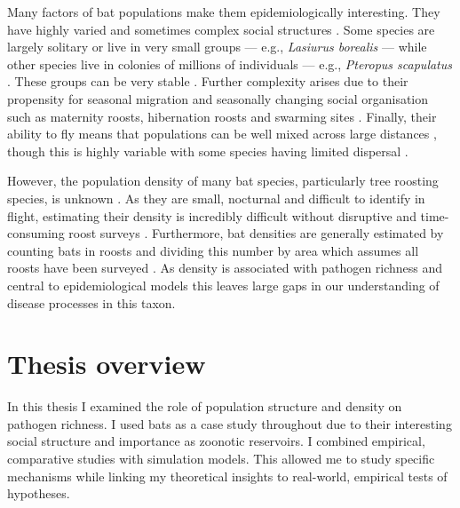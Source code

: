 Many factors of bat populations make them epidemiologically interesting.
They have highly varied and sometimes complex social structures \cite{kerth2008causes}.
Some species are largely solitary or live in very small groups --- e.g., \emph{Lasiurus borealis} \cite{shump1982lasiurus} --- while other species live in colonies of millions of individuals --- e.g., \emph{Pteropus scapulatus} \cite{birt2008little}.
These groups can be very stable \cite{kerth2011bats, mccracken1981social}.
Further complexity arises due to their propensity for seasonal migration \cite{fleming2003ecology, richter2008first, cryan2014continental} and seasonally changing social organisation such as maternity roosts, hibernation roosts and swarming sites \cite{kerth2008causes}.
Finally, their ability to fly means that populations can be well mixed across large distances \cite{peel2013continent, petit1999male}, though this is highly variable with some species having limited dispersal \cite{wilmer1994extreme}.

However, the population density of many bat species, particularly tree roosting species, is unknown \cite{clement2013estimating}.
As they are small, nocturnal and difficult to identify in flight, estimating their density is incredibly difficult without disruptive and time-consuming roost surveys \cite{kloepper2016estimating, humphrey1971photographic, sabol1995technique}.
Furthermore, bat densities are generally estimated by counting bats in roosts and dividing this number by area which assumes all roosts have been surveyed \cite{speakman1991minimum, zahn2006population, moreno2004colony}. 
As density is associated with pathogen richness \cite{kamiya2014determines} and central to epidemiological models \cite{may1979population, anderson1979population} this leaves large gaps in our understanding of disease processes in this taxon.





\section{Thesis overview}

In this thesis I examined the role of population structure and density on pathogen richness.
I used bats as a case study throughout due to their interesting social structure and importance as zoonotic	reservoirs.
I combined empirical, comparative studies with simulation models.
This allowed me to study specific mechanisms while linking my theoretical insights to real-world, empirical tests of hypotheses.


